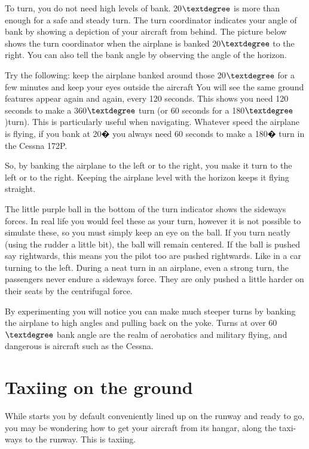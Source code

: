  To turn, you do not need high levels of bank. 
20$\textdegree$ is more than enough for a safe and steady turn. The turn
coordinator indicates your angle of bank by showing a depiction of your aircraft
from behind. The picture below shows the turn coordinator when the airplane is 
banked 20$\textdegree$ to the right. You can also tell the bank angle by 
observing the angle of the horizon.
   
Try the following: keep the airplane banked around those 20$\textdegree$ for a 
few minutes and keep your eyes outside the aircraft You will see the same 
ground features appear again and again, every 120 seconds. This shows you 
need 120 seconds to make a 360$\textdegree$ turn (or 60 seconds for a 
180$\textdegree$)turn). This is particularly useful when navigating.
Whatever speed the airplane is flying, if you bank at 20� you always need 60 
seconds to make a 180� turn in the Cessna 172P.
      
So, by banking the airplane to the left or to the right, you make it turn to 
the left or to the right. Keeping the airplane level with the horizon keeps 
it flying straight.

The little purple ball in the bottom of the turn indicator 
shows the sideways forces. In real life you would feel these as your turn, 
however it is not possible to simulate these, so you must simply keep an eye
on the ball. If you turn neatly (using the rudder a little bit), 
the ball will remain centered. If the ball is pushed say rightwards, this 
means you the pilot too are pushed rightwards. Like in a car turning to the 
left. During a neat turn in an airplane, even a strong turn, the passengers 
never endure a sideways force. They are only pushed a little harder on their 
seats by the centrifugal force.

By experimenting you will notice you can make much steeper turns by
banking the airplane to high angles and pulling back on the yoke. Turns at over
60$\textdegree$ bank angle are the realm of aerobatics and military flying, and
dangerous is aircraft such as the Cessna. 
      
\section{Taxiing on the ground}
\label{sec:TaxiTurning}

While \FlightGear{} starts you by default conveniently lined up on the
runway and ready to go, you may be wondering how to get your aircraft from
its hangar, along the taxi-ways to the runway. This is taxiing.
    
